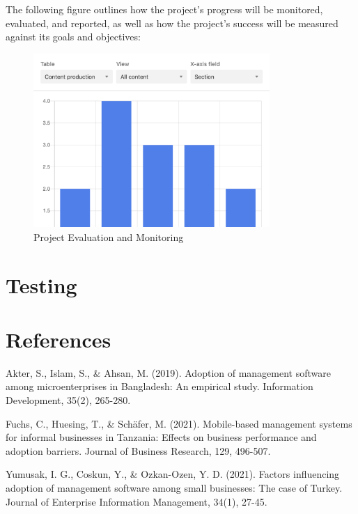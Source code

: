\documentclass{article}
\begin{document}
The following figure outlines how the project's progress will be monitored, evaluated, and reported, as well as how the project's success will be measured against its goals and objectives:

\begin{figure}[htbp]
\centering
\includegraphics[width=0.8\textwidth]{evaluation.png}
\caption{Project Evaluation and Monitoring}
\label{fig:evaluation}
\end{figure}
\newpage


\section{Testing}
\lipsum[1-2]
\newpage


\section{References}
\renewcommand{\refname}{}
\begin{thebibliography}{10}
	
	Akter, S., Islam, S., \& Ahsan, M. (2019). Adoption of management software among microenterprises in Bangladesh: An empirical study. Information Development, 35(2), 265-280.

	Fuchs, C., Huesing, T., \& Schäfer, M. (2021). Mobile-based management systems for informal businesses in Tanzania: Effects on business performance and adoption barriers. Journal of Business Research, 129, 496-507.

	Yumusak, I. G., Coskun, Y., \& Ozkan-Ozen, Y. D. (2021). Factors influencing adoption of management software among small businesses: The case of Turkey. Journal of Enterprise Information Management, 34(1), 27-45.

\end{thebibliography}
\end{document}
